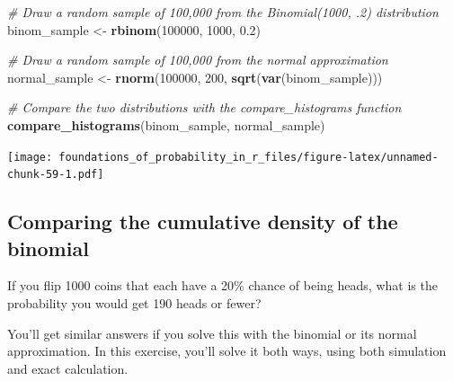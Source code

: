 \documentclass[]{article}
\newenvironment{Shaded}{\begin{snugshade}}{\end{snugshade}}
\newcommand{\CommentTok}[1]{\textcolor[rgb]{0.56,0.35,0.01}{\textit{#1}}}
\newcommand{\DecValTok}[1]{\textcolor[rgb]{0.00,0.00,0.81}{#1}}
\newcommand{\FloatTok}[1]{\textcolor[rgb]{0.00,0.00,0.81}{#1}}
\newcommand{\KeywordTok}[1]{\textcolor[rgb]{0.13,0.29,0.53}{\textbf{#1}}}
\newcommand{\NormalTok}[1]{#1}
\newcommand{\StringTok}[1]{\textcolor[rgb]{0.31,0.60,0.02}{#1}}
\begin{document}
\begin{Shaded}
\begin{Highlighting}[]
\CommentTok{# Draw a random sample of 100,000 from the Binomial(1000, .2) distribution}
\NormalTok{binom_sample <-}\StringTok{ }\KeywordTok{rbinom}\NormalTok{(}\DecValTok{100000}\NormalTok{, }\DecValTok{1000}\NormalTok{, }\FloatTok{0.2}\NormalTok{)}

\CommentTok{# Draw a random sample of 100,000 from the normal approximation}
\NormalTok{normal_sample <-}\StringTok{ }\KeywordTok{rnorm}\NormalTok{(}\DecValTok{100000}\NormalTok{, }\DecValTok{200}\NormalTok{, }\KeywordTok{sqrt}\NormalTok{(}\KeywordTok{var}\NormalTok{(binom_sample)))}

\CommentTok{# Compare the two distributions with the compare_histograms function}
\KeywordTok{compare_histograms}\NormalTok{(binom_sample, normal_sample)}
\end{Highlighting}
\end{Shaded}

\texttt{[image: foundations\_of\_probability\_in\_r\_files/figure-latex/unnamed-chunk-59-1.pdf]}

\hypertarget{comparing-the-cumulative-density-of-the-binomial}{%
\subsection{Comparing the cumulative density of the
binomial}\label{comparing-the-cumulative-density-of-the-binomial}}

If you flip 1000 coins that each have a 20\% chance of being heads, what
is the probability you would get 190 heads or fewer?

You'll get similar answers if you solve this with the binomial or its
normal approximation. In this exercise, you'll solve it both ways, using
both simulation and exact calculation.
\end{document}
